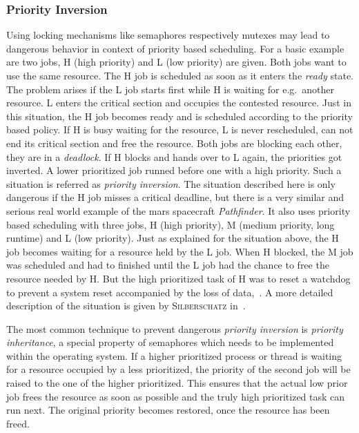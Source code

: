 \subsubsection*{Priority Inversion}\label{sec:priority-inversion}
Using locking mechanisms like semaphores respectively mutexes may lead to dangerous behavior in context of priority based scheduling.
For a basic example are two jobs, H (high priority) and L (low priority) are given.
Both jobs want to use the same resource.
The H job is scheduled as soon as it enters the \textit{ready} state.
The problem arises if the L job starts first while H is waiting for e.g.\ another resource.
L enters the critical section and occupies the contested resource.
Just in this situation, the H job becomes ready and is scheduled according to the priority based policy.
If H is busy waiting for the resource, L is never rescheduled, can not end its critical section and free the resource\cite{tanenbaum-modern-operating-systems}.
Both jobs are blocking each other, they are in a \textit{deadlock}\cite{glatz2015betriebssysteme}.
If H blocks and hands over to L again, the priorities got inverted.
A lower prioritized job runned before one with a high priority.
Such a situation is referred as \textit{priority inversion}\cite{tanenbaum-modern-operating-systems}.
The situation described here is only dangerous if the H job misses a critical deadline, but there is a very similar and serious real world example of the mars spacecraft \textit{Pathfinder}.
It also uses priority based scheduling with three jobs, H (high priority), M (medium priority, long runtime) and L (low priority).
Just as explained for the situation above, the H job becomes waiting for a resource held by the L job. 
When H blocked, the M job was scheduled and had to finished until the L job had the chance to free the resource needed by H.
But the high prioritized task of H was to reset a watchdog to prevent a system reset accompanied by the loss of data\cite{glatz2015betriebssysteme},~\cite{silberschatz2009operating}.
A more detailed description of the situation is given by \textsc{Silberschatz} in~\cite{silberschatz2009operating}.

The most common technique to prevent dangerous \textit{priority inversion} is \textit{priority inheritance}, a special property of semaphores which needs to be implemented within the operating system.
If a higher prioritized process or thread is waiting for a resource occupied by a less prioritized, the priority of the second job will be raised to the one of the higher prioritized.
This ensures that the actual low prior job frees the resource as soon as possible and the truly high prioritized task can run next.
The original priority becomes restored, once the resource has been freed\cite{glatz2015betriebssysteme}.

